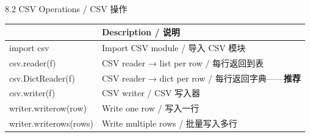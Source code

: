 \documentclass[11pt,a4paper]{report}
\begin{document}
\begin{cmdsection}{8.2  CSV Operations / CSV 操作}
\normalsize\renewcommand{\arraystretch}{1.4}
\centering
\begin{tabularx}{\textwidth}{@{}>{\ttfamily}l>{\raggedright\arraybackslash}X@{}}
\toprule
\multicolumn{1}{@{}l}{\textbf{Syntax}} & \textbf{Description / 说明} \\ \midrule
import csv                  & Import CSV module / 导入 CSV 模块 \\
csv.reader(f)               & CSV reader → list per row / 每行返回到表 \\
csv.DictReader(f)           & CSV reader → dict per row / 每行返回字典——\textbf{推荐} \\
csv.writer(f)               & CSV writer / CSV 写入器 \\
writer.writerow(row)        & Write one row / 写入一行 \\
writer.writerows(rows)      & Write multiple rows / 批量写入多行 \\
\bottomrule
\end{tabularx}
\end{cmdsection}
\end{document}
